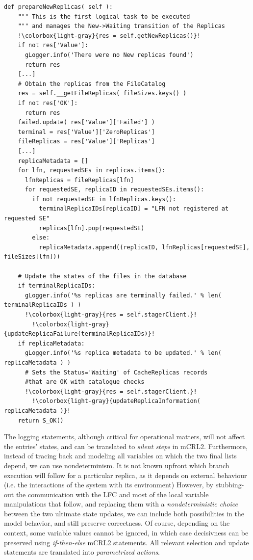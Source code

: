 \documentclass[10pt,conference]{IEEEtran}
\begin{document}
\begin{lstlisting}[float=tp,escapechar=!,basicstyle=\ttfamily\fontsize{7}{7}\selectfont]
  def prepareNewReplicas( self ):
    """ This is the first logical task to be executed 
    """ and manages the New->Waiting transition of the Replicas
    !\colorbox{light-gray}{res = self.getNewReplicas()}!
    if not res['Value']:
      gLogger.info('There were no New replicas found')
      return res
    [...]
    # Obtain the replicas from the FileCatalog
    res = self.__getFileReplicas( fileSizes.keys() )
    if not res['OK']:
      return res
    failed.update( res['Value']['Failed'] )
    terminal = res['Value']['ZeroReplicas']
    fileReplicas = res['Value']['Replicas']
    [...]
    replicaMetadata = []
    for lfn, requestedSEs in replicas.items():
      lfnReplicas = fileReplicas[lfn]
      for requestedSE, replicaID in requestedSEs.items():
        if not requestedSE in lfnReplicas.keys():
          terminalReplicaIDs[replicaID] = "LFN not registered at requested SE"
          replicas[lfn].pop(requestedSE)
        else:
          replicaMetadata.append((replicaID, lfnReplicas[requestedSE], fileSizes[lfn]))

    # Update the states of the files in the database
    if terminalReplicaIDs:
      gLogger.info('%s replicas are terminally failed.' % len( terminalReplicaIDs ) )
      !\colorbox{light-gray}{res = self.stagerClient.}!
	    !\colorbox{light-gray}{updateReplicaFailure(terminalReplicaIDs)}!
    if replicaMetadata:
      gLogger.info('%s replica metadata to be updated.' % len( replicaMetadata ) )
      # Sets the Status='Waiting' of CacheReplicas records 
      #that are OK with catalogue checks
      !\colorbox{light-gray}{res = self.stagerClient.}!
	    !\colorbox{light-gray}{updateReplicaInformation( replicaMetadata )}!
    return S_OK()

\end{lstlisting}

The logging statements, although critical for operational matters, will
not affect the entries' states, and can be translated to \textit{silent steps} in mCRL2.
Furthermore, instead of tracing back and modeling all variables on which 
the two final lists depend, we can use nondeterminism. 
It is not known upfront which branch execution will follow
for a particular replica, as it depends on external behaviour (i.e. the interactions of the system with its environment)
However, by stubbing-out the communication with the LFC and
most of the local variable manipulations 
that follow, and replacing them with a \textit{nondeterministic choice} between the two
ultimate state updates, we can include both possibilities in the model behavior,
and still preserve correctness. Of course, depending on the context, some 
variable values cannot be ignored, in which case decisivness can be preserved
using \textit{if-then-else} mCRL2 statements. All relevant selection and update 
statements are translated into \textit{parametrized actions}.
 
\end{document}
